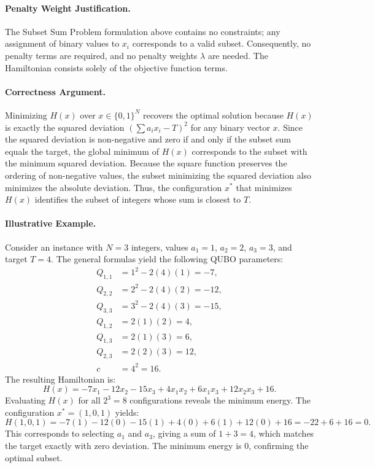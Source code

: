\documentclass[12pt]{article}
\begin{document}
\paragraph{Penalty Weight Justification.}
The Subset Sum Problem formulation above contains no constraints; any assignment of binary values to $x_i$ corresponds to a valid subset. Consequently, no penalty terms are required, and no penalty weights $\lambda$ are needed. The Hamiltonian consists solely of the objective function terms.

\paragraph{Correctness Argument.}
Minimizing $H(x)$ over $x \in \{0, 1\}^N$ recovers the optimal solution because $H(x)$ is exactly the squared deviation $(\sum a_i x_i - T)^2$ for any binary vector $x$. Since the squared deviation is non-negative and zero if and only if the subset sum equals the target, the global minimum of $H(x)$ corresponds to the subset with the minimum squared deviation. Because the square function preserves the ordering of non-negative values, the subset minimizing the squared deviation also minimizes the absolute deviation. Thus, the configuration $x^*$ that minimizes $H(x)$ identifies the subset of integers whose sum is closest to $T$.

\paragraph{Illustrative Example.}
Consider an instance with $N=3$ integers, values $a_1 = 1$, $a_2 = 2$, $a_3 = 3$, and target $T = 4$.
The general formulas yield the following QUBO parameters:
\begin{align}
    Q_{1,1} &= 1^2 - 2(4)(1) = -7, \\
    Q_{2,2} &= 2^2 - 2(4)(2) = -12, \\
    Q_{3,3} &= 3^2 - 2(4)(3) = -15, \\
    Q_{1,2} &= 2(1)(2) = 4, \\
    Q_{1,3} &= 2(1)(3) = 6, \\
    Q_{2,3} &= 2(2)(3) = 12, \\
    c &= 4^2 = 16.
\end{align}
The resulting Hamiltonian is:
\begin{equation}
    H(x) = -7x_1 - 12x_2 - 15x_3 + 4x_1x_2 + 6x_1x_3 + 12x_2x_3 + 16.
\end{equation}
Evaluating $H(x)$ for all $2^3 = 8$ configurations reveals the minimum energy. The configuration $x^* = (1, 0, 1)$ yields:
\begin{equation}
    H(1, 0, 1) = -7(1) - 12(0) - 15(1) + 4(0) + 6(1) + 12(0) + 16 = -22 + 6 + 16 = 0.
\end{equation}
This corresponds to selecting $a_1$ and $a_3$, giving a sum of $1 + 3 = 4$, which matches the target exactly with zero deviation. The minimum energy is $0$, confirming the optimal subset.
\end{document}
